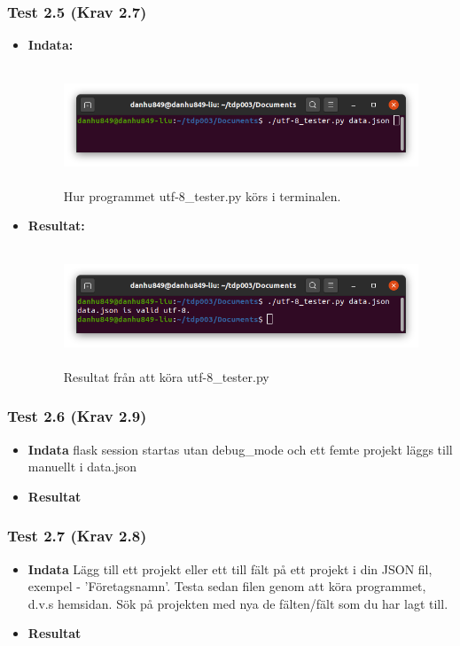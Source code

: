 \documentclass{TDP003mall}
\begin{document}
\subsubsection*{Test 2.5 (Krav 2.7)}
\begin{itemize}
\item[]\textbf{Indata:}
\begin{figure}[h]
\centerline{\includegraphics[width=\textwidth, height=3.5cm]{../Pictures/utf-8_tester_test.png}}
\caption{Hur programmet utf-8\_tester.py körs i terminalen.\label{fig:}}
\end{figure}
\item[]\textbf{Resultat:}
\begin{figure}[h]
\centerline{\includegraphics[width=\textwidth, height=3.5cm]{../Pictures/utf-8_tester_valid.png}}
\caption{Resultat från att köra utf-8\_tester.py\label{fig:}}
\end{figure}
\end{itemize}
\subsubsection*{Test 2.6 (Krav 2.9)}
\begin{itemize}
\item[]\textbf{Indata} flask session startas utan debug\_mode och ett femte projekt läggs till manuellt i data.json 
\item[]\textbf{Resultat} 
\end{itemize}
\subsubsection*{Test 2.7 (Krav 2.8)}
\begin{itemize}
\item[]\textbf{Indata} Lägg till ett projekt eller ett till fält på ett projekt i din JSON fil, exempel - 'Företagsnamn'. Testa sedan filen genom att köra programmet, d.v.s hemsidan. Sök på projekten med nya de fälten/fält som du har lagt till.  
\item[]\textbf{Resultat} 
\end{itemize}
\end{document}
